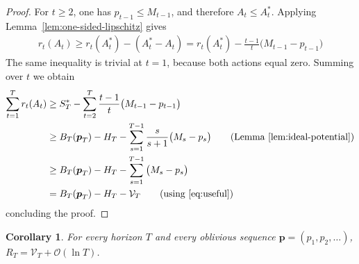 \documentclass{article}
\newtheorem{corollary}{Corollary}
\newcommand{\bp}{\boldsymbol{p}}
\newcommand{\cV}{\mathcal{V}}
\begin{document}
%
\begin{proof}
For $t \ge 2$, one has $p_{t-1} \le M_{t-1}$, and therefore $A_t \le A^*_t$.  Applying Lemma~\ref{lem:one-sided-lipschitz} gives
\begin{align*}
    r_t(A_t)
\ge
    r_t(A^*_t)-(A^*_t - A_t)
=
    r_t(A^*_t)
-
    \frac{t-1}{t}\big(M_{t-1} - p_{t-1}\big)
\end{align*}
The same inequality is trivial at $t=1$, because both actions equal zero.
Summing over $t$ we obtain
\begin{align*}
    \sum_{t=1}^T r_t(A_t)
&\ge
    S^*_T - \sum_{t=2}^T \frac{t-1}{t} \big(M_{t-1} - p_{t-1}\big)
\\&\ge
    B_T(\bp_T) - H_T - \sum_{s=1}^{T-1} \frac{s}{s+1} \big(M_s - p_s\big) \tag{Lemma~\ref{lem:ideal-potential}}
\\&\ge
    B_T(\bp_T) - H_T - \sum_{s=1}^{T-1} \big(M_s - p_s\big)
\\&=
    B_T(\bp_T) - H_T - \cV_T \tag{using~\eqref{eq:useful}}
\end{align*}
concluding the proof.
\end{proof}
%
\begin{corollary}
For every horizon $T$ and every oblivious sequence $\bp = (p_1,p_2,\ldots)$,
$
    R_T
=
    \cV_T + \mathcal{O}(\ln T)
$.
\end{corollary}
\end{document}
